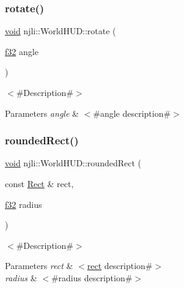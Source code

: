 \subsubsection{\texorpdfstring{rotate()}{rotate()}}
{\footnotesize\ttfamily \mbox{\hyperlink{_thread_8h_af1e856da2e658414cb2456cb6f7ebc66}{void}} njli\+::\+World\+H\+U\+D\+::rotate (\begin{DoxyParamCaption}\item[{\mbox{\hyperlink{_util_8h_a5f6906312a689f27d70e9d086649d3fd}{f32}}}]{angle }\end{DoxyParamCaption})}

$<$\#\+Description\#$>$


\begin{DoxyParams}{Parameters}
{\em angle} & $<$\#angle description\#$>$ \\
\hline
\end{DoxyParams}
\mbox{\label{classnjli_1_1_world_h_u_d_a30d1f93d6d2fe68ccf1bb1ce56e279c8}} 
\subsubsection{\texorpdfstring{rounded\+Rect()}{roundedRect()}\hspace{0.1cm}{\footnotesize\ttfamily [1/2]}}
{\footnotesize\ttfamily \mbox{\hyperlink{_thread_8h_af1e856da2e658414cb2456cb6f7ebc66}{void}} njli\+::\+World\+H\+U\+D\+::rounded\+Rect (\begin{DoxyParamCaption}\item[{const \mbox{\hyperlink{classnjli_1_1_rect}{Rect}} \&}]{rect,  }\item[{\mbox{\hyperlink{_util_8h_a5f6906312a689f27d70e9d086649d3fd}{f32}}}]{radius }\end{DoxyParamCaption})}

$<$\#\+Description\#$>$


\begin{DoxyParams}{Parameters}
{\em rect} & $<$\mbox{\hyperlink{classnjli_1_1_world_h_u_d_a4183aaaf55fabccdf9d1f9b7614f02a4}{rect}} description\#$>$ \\
\hline
{\em radius} & $<$\#radius description\#$>$ \\
\hline
\end{DoxyParams}
\mbox{\label{classnjli_1_1_world_h_u_d_a93df3aa8aa9eac57d15b721b8763a31b}} 
